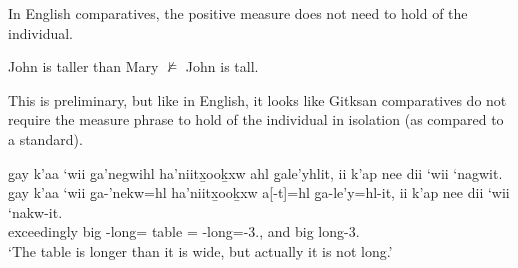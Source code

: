 \documentclass{article}
\begin{document}
In English comparatives, the positive measure does not need to hold of the individual.

\begin{exe}
    \ex John is taller than Mary $\nvDash$ John is tall.
\end{exe}

This is preliminary, but like in English, it looks like Gitksan comparatives do not require the measure phrase to hold of the individual in isolation (as compared to a standard). 


\begin{exe}
    \ex \glll
    g̱ay k’aa ‘wii g̱a’negwihl ha’niitx̱ooḵxw ahl g̱ale’yhlit, ii k’ap nee dii ‘wii ‘nagwit. \\
    g̱ay k’aa ‘wii g̱a-’nekw=hl ha’niitx̱ooḵxw a[-t]=hl g̱a-le’y=hl-it, ii k’ap nee dii ‘wii ‘nakw-it. \\
    \Cntr{} exceedingly big \Distr-long=\Cn{} table \Prep[-3.\Ii]=\Cn{} \Distr-long=\Cn{}-3.\Ii, and \Verum{} \Neg{} \Foc{} big long-3.\Ii \\
    \glt `The table is longer than it is wide, but actually it is not long.'
\end{exe}

\printbibliography
\end{document}

